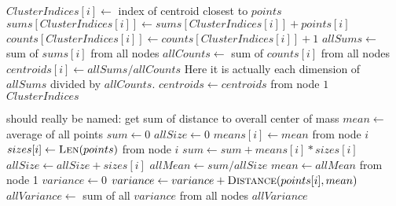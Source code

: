 \documentclass{article}
\begin{document}
\begin{algorithm}
\caption{}
\begin{algorithmic}[1]
				\State $ClusterIndices[i] \gets$ index of centroid closest to $points$
			\EndFor
				\State $sums[ClusterIndices[i]] \gets sums[ClusterIndices[i]] + points[i]$
				\State $counts[ClusterIndices[i]] \gets counts[ClusterIndices[i]] + 1$
			\EndFor
					\State $allSums \gets$ sum of $sums[i]$ from all nodes
					\State $allCounts \gets$ sum of $counts[i]$ from all nodes
					\State $centroids[i] \gets allSums / allCounts$ \Comment Here it is actually
					each dimension of $allSums$ divided by $allCounts$.
				\EndFor
			\EndIf
			\State $centroids \gets centroids$ from node $1$
		\EndWhile
		\State \Return $ClusterIndices$
	\EndFunction
\end{algorithmic}
\end{algorithm}

\begin{algorithm}
\caption{}
\begin{algorithmic}[1]
	 \Comment should really be named: get sum of distance to overall
	center of mass
		\State $mean \gets$ average of all points
			\State $sum \gets 0$
			\State $allSize \gets 0$
				\State $means[i] \gets mean$ from node $i$
				\State $sizes[i] \gets \Call{Len}{points}$ from node $i$
				\State $sum \gets sum + means[i] * sizes[i]$
				\State $allSize \gets allSize + sizes[i]$
			\EndFor
			\State $allMean \gets sum / allSize$
		\EndIf
		\State $mean \gets allMean$ from node 1
		\State $variance \gets 0$
			\State $variance \gets variance + \Call{Distance}{points[i], mean}$
		\EndFor
		\State $allVariance \gets$ sum of all $variance$ from all nodes
		\State \Return $allVariance$
	\EndFunction
\end{algorithmic}
\end{algorithm}
\end{document}

